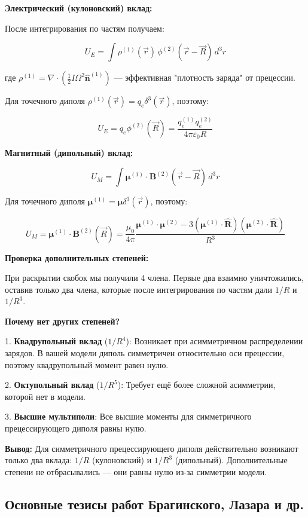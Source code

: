 \documentclass[12pt]{article}
\begin{document}
\textbf{Электрический (кулоновский) вклад:}

После интегрирования по частям получаем:

\[
U_E = \int \rho^{(1)}(\vec{r}) \, \phi^{(2)}(\vec{r} - \vec{R}) \, d^3r
\]

где $\rho^{(1)} = \nabla \cdot \left( \frac{1}{2} I \Omega^2 \hat{\boldsymbol{n}}^{(1)} \right)$ — эффективная "плотность заряда" от прецессии.

Для точечного диполя $\rho^{(1)}(\vec{r}) = q_e \delta^3(\vec{r})$, поэтому:

\[
U_E = q_e \phi^{(2)}(\vec{R}) = \frac{q_e^{(1)} q_e^{(2)}}{4\pi\varepsilon_0 R}
\]

\textbf{Магнитный (дипольный) вклад:}

\[
U_M = \int \boldsymbol{\mu}^{(1)} \cdot \boldsymbol{B}^{(2)}(\vec{r} - \vec{R}) \, d^3r
\]

Для точечного диполя $\boldsymbol{\mu}^{(1)} = \boldsymbol{\mu} \delta^3(\vec{r})$, поэтому:

\[
U_M = \boldsymbol{\mu}^{(1)} \cdot \boldsymbol{B}^{(2)}(\vec{R}) = \frac{\mu_0}{4\pi} \frac{\boldsymbol{\mu}^{(1)} \cdot \boldsymbol{\mu}^{(2)} - 3(\boldsymbol{\mu}^{(1)} \cdot \hat{\boldsymbol{R}})(\boldsymbol{\mu}^{(2)} \cdot \hat{\boldsymbol{R}})}{R^3}
\]

\textbf{Проверка дополнительных степеней:}

При раскрытии скобок мы получили 4 члена. Первые два взаимно уничтожились, оставив только два члена, которые после интегрирования по частям дали $1/R$ и $1/R^3$.

\textbf{Почему нет других степеней?}

1. \textbf{Квадрупольный вклад} ($1/R^4$): Возникает при асимметричном распределении зарядов. В вашей модели диполь симметричен относительно оси прецессии, поэтому квадрупольный момент равен нулю.

2. \textbf{Октупольный вклад} ($1/R^5$): Требует ещё более сложной асимметрии, которой нет в модели.

3. \textbf{Высшие мультиполи}: Все высшие моменты для симметричного прецессирующего диполя равны нулю.

\textbf{Вывод:} Для симметричного прецессирующего диполя действительно возникают только два вклада: $1/R$ (кулоновский) и $1/R^3$ (дипольный). Дополнительные степени не отбрасывались — они равны нулю из-за симметрии модели.

\subsection{Основные тезисы работ Брагинского, Лазара и др.}
\end{document}
